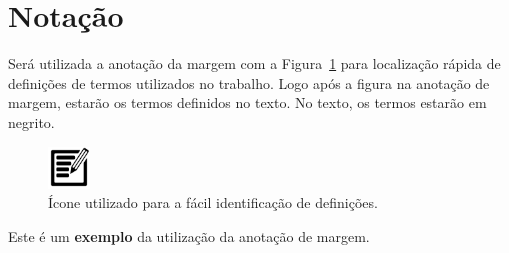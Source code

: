 \section{Notação}

Será utilizada a anotação da margem com a Figura~\ref{fig:icone-definicao} para localização rápida de definições de termos utilizados no trabalho. Logo após a figura na anotação de margem, estarão os termos definidos no texto. No texto, os termos estarão em negrito.

\begin{figure}[!htb]
	\center
	\includegraphics[width=0.1\textwidth]{dados/figuras/icone-definicao.png}
	\caption{Ícone utilizado para a fácil identificação de definições.}
	\label{fig:icone-definicao}
\end{figure}

Este é um \textbf{exemplo} da utilização da anotação de margem.
